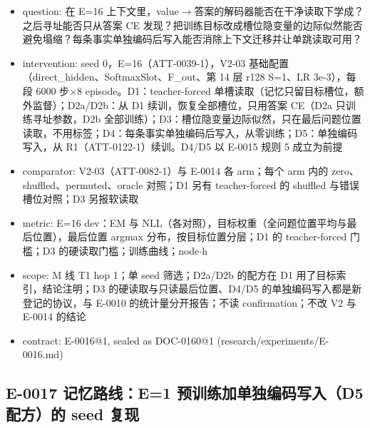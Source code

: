\documentclass[11pt]{article}
\begin{document}
\begin{itemize}
\item question: 在 E=16 上下文里，value\ensuremath{\rightarrow}答案的解码器能否在干净读取下学成？之后寻址能否只从答案 CE 发现？把训练目标改成槽位隐变量的边际似然能否避免塌缩？每条事实单独编码后写入能否消除上下文迁移并让单跳读取可用？
\item intervention: seed 0，E=16（ATT-0039-1），V2-03 基础配置（direct\_hidden、SoftmaxSlot、F\_out、第 14 层 r128 S=1、LR 3e-3），每段 6000 步\ensuremath{\times}8 episode。D1：teacher-forced 单槽读取（记忆只留目标槽位，额外监督）；D2a/D2b：从 D1 续训，恢复全部槽位，只用答案 CE（D2a 只训练寻址参数，D2b 全部训练）；D3：槽位隐变量边际似然，只在最后问题位置读取，不用标签；D4：每条事实单独编码后写入，从零训练；D5：单独编码写入，从 R1（ATT-0122-1）续训。D4/D5 以 E-0015 规则 5 成立为前提
\item comparator: V2-03（ATT-0082-1）与 E-0014 各 arm；每个 arm 内的 zero、shuffled、permuted、oracle 对照；D1 另有 teacher-forced 的 shuffled 与错误槽位对照；D3 另报软读取
\item metric: E=16 dev：EM 与 NLL（各对照），目标权重（全问题位置平均与最后位置），最后位置 argmax 分布，按目标位置分层；D1 的 teacher-forced 门槛；D3 的硬读取门槛；训练曲线；node\ensuremath{\cdot}h
\item scope: M 线 T1 hop 1；单 seed 筛选；D2a/D2b 的配方在 D1 用了目标索引，结论注明；D3 的硬读取与只读最后位置、D4/D5 的单独编码写入都是新登记的协议，与 E-0010 的统计量分开报告；不读 confirmation；不改 V2 与 E-0014 的结论
\item contract: E-0016@1, sealed as DOC-0160@1 (research/experiments/E-0016.md)
\end{itemize}

\subsection*{E-0017 记忆路线：E=1 预训练加单独编码写入（D5 配方）的 seed 复现}
\end{document}
